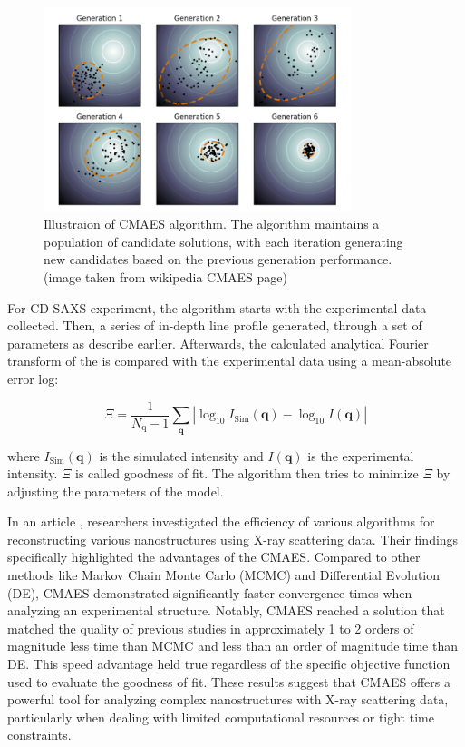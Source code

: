 \begin{figure}[h]
    \centering
    \includegraphics[width=0.8\textwidth]{images/CMAES.png}
    \caption{Illustraion of CMAES algorithm. The algorithm maintains a population of candidate solutions, with each 
    iteration generating new candidates based on the previous generation performance.(image taken from wikipedia CMAES page) }
    \label{fig:cmaes}
\end{figure}

\FloatBarrier

\medskip

For CD-SAXS experiment, the algorithm starts with the experimental data collected. Then, a series of in-depth line profile generated, through a set of parameters as describe earlier. 
Afterwards, the calculated analytical Fourier transform of the is compared with the experimental data using a mean-absolute error log:

\medskip

\begin{equation}
    \Xi=\frac{1}{N_{\mathrm{q}}-1} \sum_{\mathbf{q}}\left|\log _{10} I_{\mathrm{Sim}}(\mathbf{q})-\log _{10} I(\mathbf{q})\right|
\end{equation}

\medskip

where $I_{\mathrm{Sim}}(\mathbf{q})$ is the simulated intensity and $I(\mathbf{q})$ is the experimental intensity.
$\Xi$ is called goodness of fit. The algorithm then tries to minimize $\Xi$ by adjusting the parameters of the model.

\medskip

In an article \cite{hannon2016advancing}, researchers investigated the efficiency of various algorithms
for reconstructing various nanostructures using X-ray scattering data.
Their findings specifically highlighted the advantages of the CMAES. Compared to other
methods like Markov Chain Monte Carlo (MCMC) and Differential Evolution 
(DE), CMAES demonstrated significantly faster convergence times when 
analyzing an experimental structure. Notably, CMAES reached a solution 
that matched the quality of previous studies in approximately 1 to 2 
orders of magnitude less time than MCMC and less than an order of 
magnitude time than DE. This speed advantage held true regardless 
of the specific objective function used to evaluate the goodness of fit. 
These results suggest that CMAES offers a powerful tool for analyzing 
complex nanostructures with X-ray scattering data, particularly when 
dealing with limited computational resources or tight time constraints.

